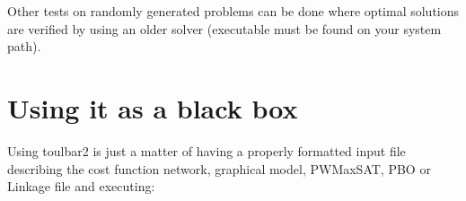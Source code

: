\documentclass[letterpaper,10pt,openany,oneside,english]{sphinxmanual}
\begin{document}
\begin{sphinxVerbatim}[commandchars=\\\{\}]
 
  
 
\end{sphinxVerbatim}

\sphinxAtStartPar
Other tests on randomly generated problems can be done where optimal solutions are verified by using an older solver  (executable must be found on your system path).

\begin{sphinxVerbatim}[commandchars=\\\{\}]
 
  
 
 
 
\end{sphinxVerbatim}


\chapter{Using it as a black box}
\label{\detokenize{userdoc:using-it-as-a-black-box}}
\sphinxAtStartPar
Using toulbar2 is just a matter of having a properly formatted input
file describing the cost function network, graphical model, PWMaxSAT,
PBO or Linkage  file and executing:

\begin{sphinxVerbatim}[commandchars=\\\{\}]
 \PYG{p}{[} \PYG{p}{]} 
\end{sphinxVerbatim}
\end{document}
